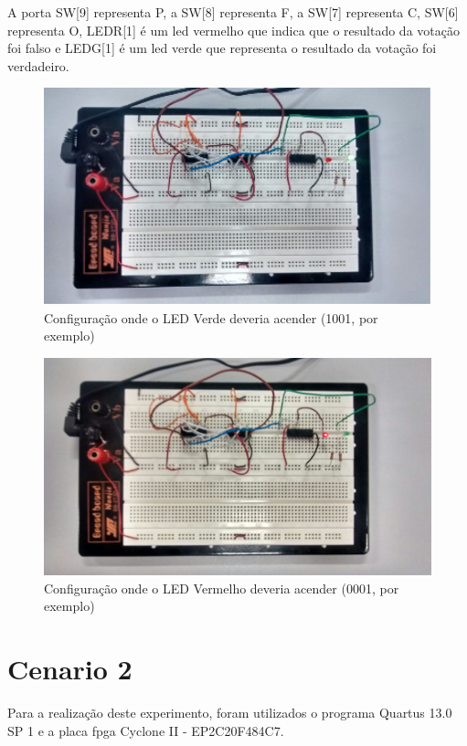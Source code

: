 	A porta SW[9] representa P, a SW[8] representa F, a SW[7]
	 representa C, SW[6] representa O, LEDR[1] é um led vermelho que indica
	 que o resultado da votação foi falso e LEDG[1] é um led verde que representa o resultado da votação
	 foi verdadeiro.

	\begin{figure}[H]
		\centering
		\caption{\label{fig:protoboard1}Configuração onde o LED Verde deveria acender (1001, por exemplo)}
		\includegraphics[width=1\textwidth]{img/cenario1/protoboard1}
	\end{figure}

	\begin{figure}[H]
		\centering
		\caption{\label{fig:protoboard2}Configuração onde o LED Vermelho deveria acender (0001, por exemplo)}
		\includegraphics[width=1\textwidth]{img/cenario1/protoboard2}
	\end{figure}

\section{Cenario 2}
	Para a realização deste experimento, foram utilizados o programa Quartus 13.0 SP 1 e a placa \ac{fpga}
	Cyclone II - EP2C20F484C7.

